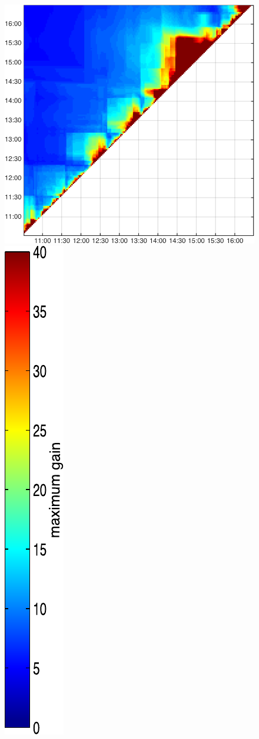 \begin{figure}
\begin{minipage}[c]{\mylength}
\includegraphics[valign=t,width=\eventswidth]{events/20141006-maxGain-local-events.png}
\includegraphics[valign=t,trim=2pt -8pt 0 5pt,width=\colorbarwidth,totalheight=\eventheight]{events/colorbar-40.pdf}

\end{minipage}
\end{figure}
